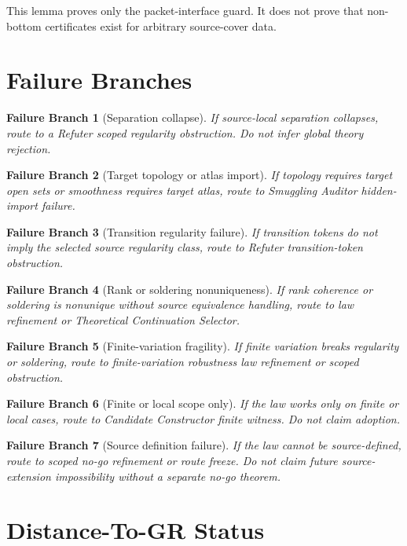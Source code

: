 \documentclass[11pt]{article}
\newtheorem{branch}{Failure Branch}
\begin{document}
This lemma proves only the packet-interface guard. It does not prove that
non-bottom certificates exist for arbitrary source-cover data.

\section{Failure Branches}

\begin{branch}[Separation collapse]
If source-local separation collapses, route to a Refuter scoped regularity
obstruction. Do not infer global theory rejection.
\end{branch}

\begin{branch}[Target topology or atlas import]
If topology requires target open sets or smoothness requires target atlas,
route to Smuggling Auditor hidden-import failure.
\end{branch}

\begin{branch}[Transition regularity failure]
If transition tokens do not imply the selected source regularity class, route
to Refuter transition-token obstruction.
\end{branch}

\begin{branch}[Rank or soldering nonuniqueness]
If rank coherence or soldering is nonunique without source equivalence
handling, route to law refinement or Theoretical Continuation Selector.
\end{branch}

\begin{branch}[Finite-variation fragility]
If finite variation breaks regularity or soldering, route to finite-variation
robustness law refinement or scoped obstruction.
\end{branch}

\begin{branch}[Finite or local scope only]
If the law works only on finite or local cases, route to Candidate Constructor
finite witness. Do not claim adoption.
\end{branch}

\begin{branch}[Source definition failure]
If the law cannot be source-defined, route to scoped no-go refinement or route
freeze. Do not claim future source-extension impossibility without a separate
no-go theorem.
\end{branch}

\section{Distance-To-GR Status}
\end{document}
